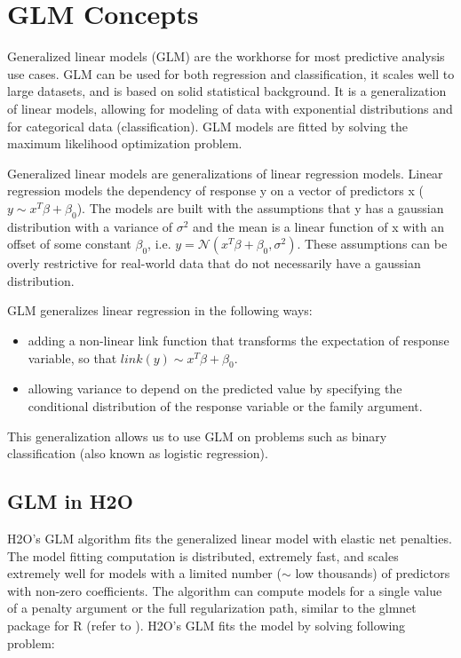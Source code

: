 \newcommand{\waterVersion}{3.0.1.4}


\section{GLM Concepts}
Generalized linear models (GLM) are the workhorse for most predictive analysis use cases. GLM can be used for both
regression and classification, it scales well to large datasets, and is based on solid statistical background. It
is a generalization of linear models, allowing for modeling of data with exponential distributions and for
categorical data (classification). GLM models are fitted by solving the maximum likelihood optimization problem.

Generalized linear models are generalizations of linear regression models. Linear regression models the dependency
of response y on a vector of predictors x ($y \sim x^T \beta + \beta_0$). The models are built with the assumptions
that y has a gaussian distribution with a variance of $\sigma^2$ and the mean is a linear function of x with an
offset of some constant $\beta_0$, i.e. $ y = \mathcal{N}(x^T \beta + \beta_0 , \sigma^2) $. These assumptions can
be overly restrictive for real-world data that do not necessarily have a gaussian distribution.

GLM generalizes linear regression in the following ways: 

\begin{itemize} 
\item adding a non-linear link function that transforms the expectation of response variable, so that $link(y) \sim x^T \beta + \beta_0$.
\item allowing variance to depend on the predicted value by specifying the conditional distribution of the response variable or the family argument.
\end{itemize}

This generalization allows us to use GLM on problems such as binary classification (also known as logistic regression).

\subsection{GLM in H2O}
H2O's GLM algorithm fits the generalized linear model with elastic net penalties. The model fitting computation is
distributed, extremely fast, and scales extremely well for models with a limited number ($\mathtt{\sim}$ low
thousands) of predictors with non-zero coefficients. The algorithm can compute models for a single value of a
penalty argument or the full regularization path, similar to the glmnet package for R (refer
to ).  H2O's GLM fits the model by solving following problem:

